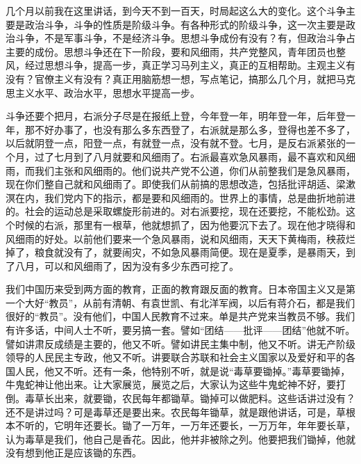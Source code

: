几个月以前我在这里讲话，到今天不到一百天，时局起这么大的变化。这个斗争主要是政治斗争，斗争的性质是阶级斗争。有各种形式的阶级斗争，这一次主要是政治斗争，不是军事斗争，不是经济斗争。思想斗争成份有没有？有，但政治斗争占主要的成份。思想斗争还在下一阶段，要和风细雨，共产党整风，青年团员也整风，经过思想斗争，提高一步，真正学习马列主义，真正的互相帮助。主观主义有没有？官僚主义有没有？真正用脑筋想一想，写点笔记，搞那么几个月，就把马克思主义水平、政治水平，思想水平提高一步。

斗争还要个把月，右派分子尽是在报纸上登，今年登一年，明年登一年，后年登一年，那不好办事了，也没有那么多东西登了，右派就是那么多，登得也差不多了，以后就阴登一点，阳登一点，有就登一点，没有就不登。七月，是反右派紧张的一个月，过了七月到了八月就要和风细雨了。右派最喜欢急风暴雨，最不喜欢和风细雨，而我们主张和风细雨的。他们说共产党不公道，你们从前整我们是急风暴雨，现在你们整自己就和风细雨了。即使我们从前搞的思想改造，包括批评胡适、梁漱溟在内，我们党内下的指示，都是要和风细雨的。世界上的事情，总是曲折地前进的。社会的运动总是采取螺旋形前进的。对右派要挖，现在还要挖，不能松劲。这个时候的右派，那里有一根草，他就想抓了，因为他要沉下去了。现在他才晓得和风细雨的好处。以前他们要来一个急风暴雨，说和风细雨，天天下黄梅雨，秧菽烂掉了，粮食就没有了，就要闹灾，不如急风暴雨简便。现在是夏季，是暴雨天，到了八月，可以和风细雨了，因为没有多少东西可挖了。

我们中国历来受到两方面的教育，正面的教育跟反面的教育。日本帝国主义又是第一个大好“教员”，从前有清朝、有袁世凯、有北洋军阀，以后有蒋介石，都是我们很好的“教员”。没有他们，中国人民教育不过来。单是共产党来当教员不够。我们有许多话，中间人士不听，要另搞一套。譬如“团结——批评——团结”他就不听。譬如讲肃反成绩是主要的，他又不听。譬如讲民主集中制，他又不听。讲无产阶级领导的人民民主专政，他又不听。讲要联合苏联和社会主义国家以及爱好和平的各国人民，他又不听。还有一条，他特别不听，就是说“毒草要锄掉。”毒草要锄掉，牛鬼蛇神让他出来。让大家展览，展览之后，大家认为这些牛鬼蛇神不好，要打倒。毒草长出来，就要锄，农民每年都锄草。锄掉可以做肥料。这些话讲过没有？还不是讲过吗？可是毒草还是要出来。农民每年锄草，就是跟他讲话，可是，草根本不听的，它明年还要长。锄了一万年，一万年还要长，一万万年，年年要长草，认为毒草是我们，他自己是香花。因此，他并非被除之列。他要把我们锄掉，他就没有想到他正是应该锄的东西。


